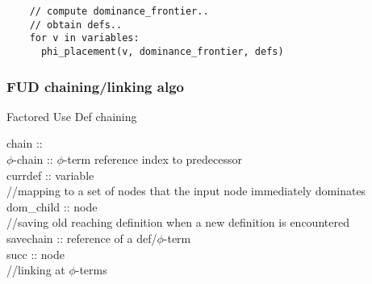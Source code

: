 \documentclass[8pt]{extarticle}
\begin{document}
\begin{multicols*}{2}
  \begin{lstlisting}
    // compute dominance_frontier..
    // obtain defs..
    for v in variables:
      phi_placement(v, dominance_frontier, defs)
  \end{lstlisting}

  \vfill\null
  \columnbreak
    
  \subsubsection{FUD chaining/linking algo \cite{wolfebook}}
  Factored Use Def chaining\\
  \begin{algorithm}[H]
    chain ::  \rightarrow {}\\
    $\phi$-chain :: $\phi$-term reference \rightarrow index to predecessor \rightarrow {}\\
    currdef :: variable \rightarrow {}\\
    //mapping to a set of nodes that the input node immediately dominates\\
    dom\_child :: node \rightarrow {}\\
    //saving old reaching definition when a new definition is encountered\\
    savechain :: reference of a def/$\phi$-term \rightarrow {}\\
    succ :: node \rightarrow {}\\
    //linking at $\phi$-terms\\
\end{algorithm}
\end{multicols*}
\end{document}

